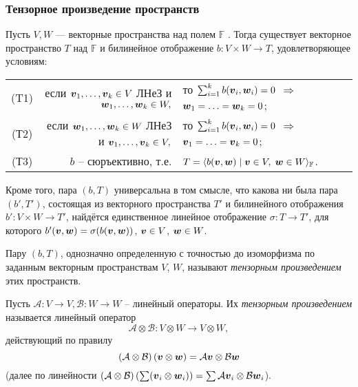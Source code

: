 \subsubsection{Тензорное произведение пространств}
\begin{to_thr} 
    Пусть $V, W$ --- векторные пространства над полем $\mathbb{F}$ . Тогда существует векторное пространство $T$ над $\mathbb{F}$ и билинейное отображение $b \colon V \times W \to T$, удовлетворяющее условиям:

             \begin{tabular}{c|rl}
                (T1) &
                если $\mbox{\boldmath $v$}_{1}, \ldots, \mbox{\boldmath $v$}_k \in V$ ЛНеЗ и $\mbox{\boldmath $w$}_{1}, \ldots, \mbox{\boldmath $w$}_k \in W,$  & 
                то $\sum_{i=1}^k b(\mbox{\boldmath $v$}_i, \mbox{\boldmath $w$}_i) = 0$ $\Longrightarrow$ $\mbox{\boldmath $w$}_{1}=\ldots =\mbox{\boldmath $w$}_k=0$;\\
                (Т2) &
                если $\mbox{\boldmath $w$}_{1}, \ldots, \mbox{\boldmath $w$}_k \in W$ ЛНеЗ и $\mbox{\boldmath $v$}_{1}, \ldots, \mbox{\boldmath $v$}_k \in V,$  & 
                то $\sum_{i=1}^k b(\mbox{\boldmath $v$}_i, \mbox{\boldmath $w$}_i) = 0$ $\Longrightarrow$ $\mbox{\boldmath $v$}_{1}=\ldots =\mbox{\boldmath $v$}_k=0$;\\
                (Т3) &
                $b$ -- сюръективно, т.е. &
                $T = \langle b(\mbox{\boldmath $v$}, \mbox{\boldmath $w$}) \mid \mbox{\boldmath $v$} \in V, \; \mbox{\boldmath $w$} \in W\rangle_{\mathbb{F}}$.
             \end{tabular}
      
      Кроме того, пара $(b, T)$ универсальна в том смысле, что какова ни была пара $(b', T')$, состоящая из векторного пространства $T'$ и билинейного отображения $b' \colon V \times W \to T'$, найдётся единственное линейное отображение $\sigma \colon T \to T'$, для которого $b' (\mbox{\boldmath $v$}, \mbox{\boldmath $w$}) = \sigma (b(\mbox{\boldmath $v$}, \mbox{\boldmath $w$}))$, $\mbox{\boldmath $v$} \in V$, $\mbox{\boldmath $w$} \in W$.
\end{to_thr}



\begin{to_def} 
    Пару $(b, T)$, однозначно определенную с точностью до изоморфизма по заданным векторным пространствам $V$, $W$, называют \textit{тензорным произведением} этих пространств.
\end{to_def}

\begin{to_def} 
    Пусть $\mathcal A \colon V \to V, \mathcal B \colon W \to W$ -- линейный операторы. Их \textit{тензорным произведением} называется линейный оператор 
    $$
        \mathcal A \otimes \mathcal B \colon V \otimes W \to V \otimes W,
    $$
    действующий по правилу
    $$
        \left(\mathcal A \otimes \mathcal B\right) \left(\mbox{\boldmath $v$} \otimes \mbox{\boldmath $w$}\right) = \mathcal A \mbox{\boldmath $v$} \otimes \mathcal B \mbox{\boldmath $w$}
    $$
    (далее по линейности $\left(\mathcal A \otimes \mathcal B\right) \left( \sum (\mbox{\boldmath $v$}_i \otimes \mbox{\boldmath $w$}_i)\right) = \sum \mathcal A \mbox{\boldmath $v$}_i \otimes \mathcal B \mbox{\boldmath $w$}_i$).
\end{to_def}

